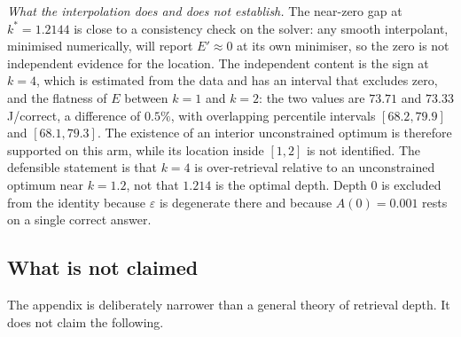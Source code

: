 \emph{What the interpolation does and does not establish.} The near-zero gap at
$k^{*}=1.2144$ is close to a consistency check on the solver: any smooth
interpolant, minimised numerically, will report $E'\approx0$ at its own
minimiser, so the zero is not independent evidence for the location. The
independent content is the sign at $k=4$, which is estimated from the data and
has an interval that excludes zero, and the flatness of $E$ between $k=1$ and
$k=2$: the two values are $73.71$ and $73.33$ J/correct, a difference of $0.5\%$,
with overlapping percentile intervals $[68.2,79.9]$ and $[68.1,79.3]$. The
existence of an interior unconstrained optimum is therefore supported on this
arm, while its location inside $[1,2]$ is not identified. The defensible
statement is that $k=4$ is over-retrieval relative to an unconstrained optimum
near $k=1.2$, not that $1.214$ is the optimal depth. Depth $0$ is excluded from
the identity because $\varepsilon$ is degenerate there and because $A(0)=0.001$
rests on a single correct answer.

\subsection{What is not claimed}\label{app:notclaimed}

The appendix is deliberately narrower than a general theory of retrieval depth.
It does not claim the following.

